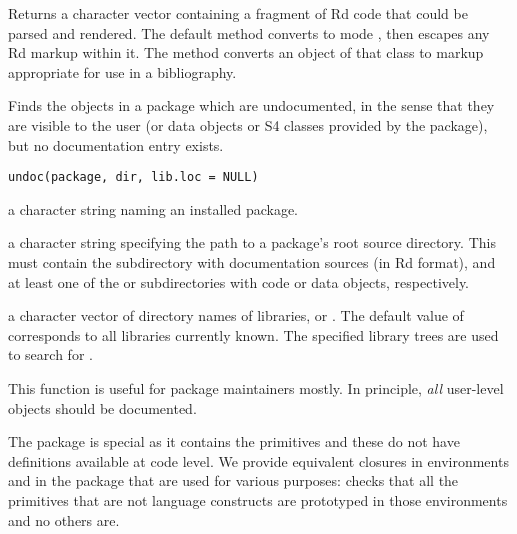%
\begin{Value}
Returns a character vector containing a fragment of Rd code that could
be parsed and rendered.  The default method converts  to mode ,
then escapes any Rd markup within it.  The  method converts an
object of that class to markup appropriate for use in a bibliography.
\end{Value}
%
\begin{Description}\relax
Finds the objects in a package which are undocumented, in the sense
that they are visible to the user (or data objects or S4 classes
provided by the package), but no documentation entry exists.
\end{Description}
%
\begin{Usage}
\begin{verbatim}
undoc(package, dir, lib.loc = NULL)
\end{verbatim}
\end{Usage}
%
\begin{Arguments}
\begin{ldescription}
\item[\code{package}] a character string naming an installed package.
\item[\code{dir}] a character string specifying the path to a package's root
source directory.  This must contain the subdirectory 
with \R{} documentation sources (in Rd format), and at least one of
the  or  subdirectories with \R{} code or data
objects, respectively.
\item[\code{lib.loc}] a character vector of directory names of \R{} libraries,
or .  The default value of  corresponds to all
libraries currently known.  The specified library trees are used to
search for .
\end{ldescription}
\end{Arguments}
%
\begin{Details}\relax
This function is useful for package maintainers mostly.  In principle,
\emph{all} user-level \R{} objects should be documented.

The  package is special as it contains the primitives and
these do not have definitions available at code level.  We provide
equivalent closures in environments  and
 in the  package that are used
for various purposes:  checks that all the
primitives that are not language constructs are prototyped in those
environments and no others are.
\end{Details}
